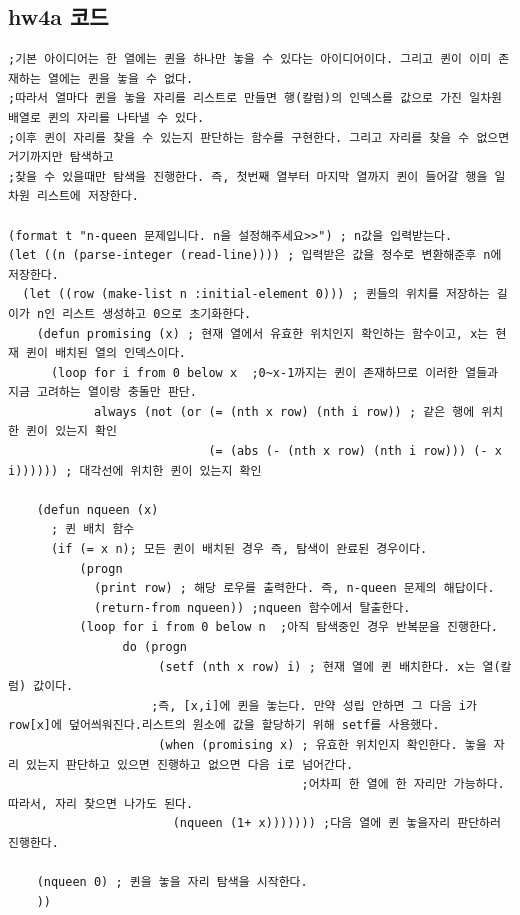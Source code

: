 \documentclass{article}
\begin{document}
\subsection{hw4a 코드}
\begin{verbatim}
;기본 아이디어는 한 열에는 퀸을 하나만 놓을 수 있다는 아이디어이다. 그리고 퀸이 이미 존재하는 열에는 퀸을 놓을 수 없다.
;따라서 열마다 퀸을 놓을 자리를 리스트로 만들면 행(칼럼)의 인덱스를 값으로 가진 일차원 배열로 퀸의 자리를 나타낼 수 있다.
;이후 퀸이 자리를 찾을 수 있는지 판단하는 함수를 구현한다. 그리고 자리를 찾을 수 없으면 거기까지만 탐색하고 
;찾을 수 있을때만 탐색을 진행한다. 즉, 첫번째 열부터 마지막 열까지 퀸이 들어갈 행을 일차원 리스트에 저장한다.

(format t "n-queen 문제입니다. n을 설정해주세요>>") ; n값을 입력받는다.
(let ((n (parse-integer (read-line)))) ; 입력받은 값을 정수로 변환해준후 n에 저장한다.
  (let ((row (make-list n :initial-element 0))) ; 퀸들의 위치를 저장하는 길이가 n인 리스트 생성하고 0으로 초기화한다. 
    (defun promising (x) ; 현재 열에서 유효한 위치인지 확인하는 함수이고, x는 현재 퀸이 배치된 열의 인덱스이다. 
      (loop for i from 0 below x  ;0~x-1까지는 퀸이 존재하므로 이러한 열들과 지금 고려하는 열이랑 충돌만 판단. 
            always (not (or (= (nth x row) (nth i row)) ; 같은 행에 위치한 퀸이 있는지 확인
                            (= (abs (- (nth x row) (nth i row))) (- x i)))))) ; 대각선에 위치한 퀸이 있는지 확인

    (defun nqueen (x)
      ; 퀸 배치 함수
      (if (= x n); 모든 퀸이 배치된 경우 즉, 탐색이 완료된 경우이다.
          (progn
            (print row) ; 해당 로우를 출력한다. 즉, n-queen 문제의 해답이다.
            (return-from nqueen)) ;nqueen 함수에서 탈출한다.
          (loop for i from 0 below n  ;아직 탐색중인 경우 반복문을 진행한다.
                do (progn             
                     (setf (nth x row) i) ; 현재 열에 퀸 배치한다. x는 열(칼럼) 값이다. 
                    ;즉, [x,i]에 퀸을 놓는다. 만약 성립 안하면 그 다음 i가 row[x]에 덮어씌워진다.리스트의 원소에 값을 할당하기 위해 setf를 사용했다.
                     (when (promising x) ; 유효한 위치인지 확인한다. 놓을 자리 있는지 판단하고 있으면 진행하고 없으면 다음 i로 넘어간다. 
                                         ;어차피 한 열에 한 자리만 가능하다. 따라서, 자리 찾으면 나가도 된다.
                       (nqueen (1+ x))))))) ;다음 열에 퀸 놓을자리 판단하러 진행한다.

    (nqueen 0) ; 퀸을 놓을 자리 탐색을 시작한다.
    ))
\end{verbatim}
\end{document}
